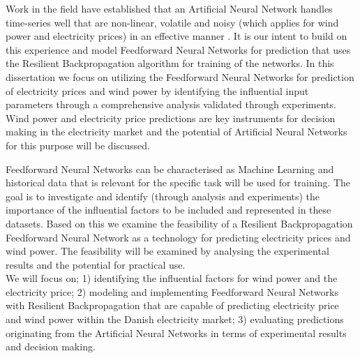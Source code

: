 Work in the field have established that an Artificial Neural Network handles time-series well that are non-linear, volatile and noisy (which applies for wind power and electricity prices) in an effective manner \cite{stockForecasting,pjmForecast,yamin2004adaptive,windForecastPortugal}. It is our intent to build on this experience and model Feedforward Neural Networks for prediction that uses the Resilient Backpropagation algorithm for training of the networks. In this dissertation we focus on utilizing the Feedforward Neural Networks for prediction of electricity prices and wind power by identifying the influential input parameters through a comprehensive analysis validated through experiments. Wind power and electricity price predictions are key instruments for decision making in the electricity market\cite{dayAheadImpactOfWindPowerForecasts,21} and the potential of Artificial Neural Networks for this purpose will be discussed.

Feedforward Neural Networks can be characterised as Machine Learning\cite{18} and historical data that is relevant for the specific task will be used for training. The goal is to investigate and identify (through analysis and experiments) the importance of the influential factors to be included and represented in these datasets. Based on this we examine the feasibility of a Resilient Backpropagation Feedforward Neural Network as a technology for predicting electricity prices and wind power. The feasibility will be examined by analysing the experimental results and the potential for practical use.
\\[0.5cm]
We will focus on; 1) identifying the influential factors for wind power and the electricity price; 2) modeling and implementing Feedforward Neural Networks with Resilient Backpropagation that are capable of predicting electricity price and wind power within the Danish electricity market; 3) evaluating predictions originating from the Artificial Neural Networks in terms of experimental results and decision making.